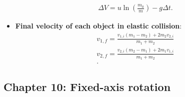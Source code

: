 \documentclass{report}
\begin{document}
\begin{itemize}
\begin{align*}
                \Delta V = u\ln{\left(\frac{m_{0}}{m}\right)} - g\Delta t
            .\end{align*}
    \item \textbf{Final velocity of each object in elastic collision}:
        \begin{align*}
            v_{1,f} = \frac{v_{1,i}(m_{1} - m_{2}) + 2m_{2}v_{2,i}}{m_{1} + m_{2}} \\
            v_{2,f} = \frac{v_{2,i}(m_{2} - m_{1}) + 2m_{1}v_{1,i}}{m_{1} + m_{2}} \\
        .\end{align*}





    \end{itemize}

    \pagebreak 
    \subsection{Chapter 10: Fixed-axis rotation}
    \bigbreak \noindent 
\end{document}
